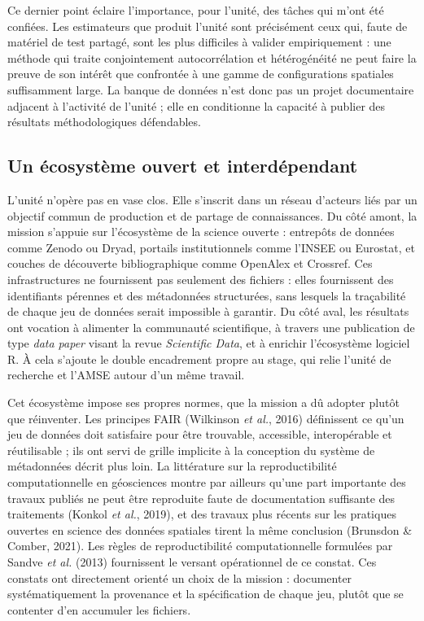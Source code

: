 \documentclass[11pt,a4paper]{article}
\begin{document}
Ce dernier point éclaire l'importance, pour l'unité, des tâches qui m'ont été confiées. Les estimateurs que produit l'unité sont précisément ceux qui, faute de matériel de test partagé, sont les plus difficiles à valider empiriquement : une méthode qui traite conjointement autocorrélation et hétérogénéité ne peut faire la preuve de son intérêt que confrontée à une gamme de configurations spatiales suffisamment large. La banque de données n'est donc pas un projet documentaire adjacent à l'activité de l'unité ; elle en conditionne la capacité à publier des résultats méthodologiques défendables.

\subsection{Un écosystème ouvert et interdépendant}

L'unité n'opère pas en vase clos. Elle s'inscrit dans un réseau d'acteurs liés par un objectif commun de production et de partage de connaissances. Du côté amont, la mission s'appuie sur l'écosystème de la science ouverte : entrepôts de données comme Zenodo ou Dryad, portails institutionnels comme l'INSEE ou Eurostat, et couches de découverte bibliographique comme OpenAlex et Crossref. Ces infrastructures ne fournissent pas seulement des fichiers : elles fournissent des identifiants pérennes et des métadonnées structurées, sans lesquels la traçabilité de chaque jeu de données serait impossible à garantir. Du côté aval, les résultats ont vocation à alimenter la communauté scientifique, à travers une publication de type \textit{data paper} visant la revue \textit{Scientific Data}, et à enrichir l'écosystème logiciel R. À cela s'ajoute le double encadrement propre au stage, qui relie l'unité de recherche et l'AMSE autour d'un même travail.

Cet écosystème impose ses propres normes, que la mission a dû adopter plutôt que réinventer. Les principes FAIR (Wilkinson \textit{et al.}, 2016) définissent ce qu'un jeu de données doit satisfaire pour être trouvable, accessible, interopérable et réutilisable ; ils ont servi de grille implicite à la conception du système de métadonnées décrit plus loin. La littérature sur la reproductibilité computationnelle en géosciences montre par ailleurs qu'une part importante des travaux publiés ne peut être reproduite faute de documentation suffisante des traitements (Konkol \textit{et al.}, 2019), et des travaux plus récents sur les pratiques ouvertes en science des données spatiales tirent la même conclusion (Brunsdon \& Comber, 2021). Les règles de reproductibilité computationnelle formulées par Sandve \textit{et al.} (2013) fournissent le versant opérationnel de ce constat. Ces constats ont directement orienté un choix de la mission : documenter systématiquement la provenance et la spécification de chaque jeu, plutôt que se contenter d'en accumuler les fichiers.
\end{document}
